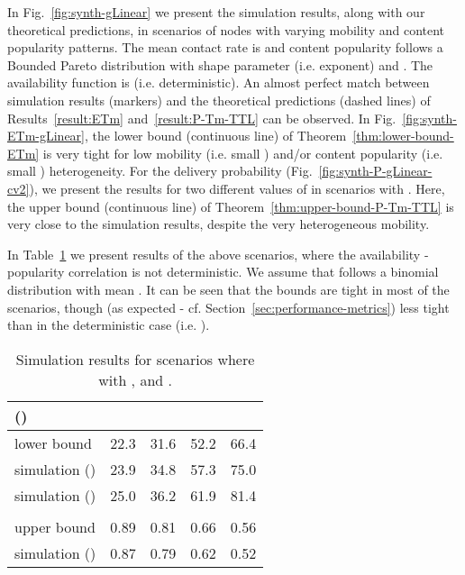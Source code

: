 \documentclass[journal]{IEEEtran}
\begin{document}
In Fig.~\ref{fig:synth-gLinear} we present the simulation results, along with our theoretical predictions, in scenarios of  nodes with varying mobility and content popularity patterns. The mean contact rate is  and content popularity follows a Bounded Pareto distribution with shape parameter (i.e. exponent)  and . The availability function is  (i.e. deterministic). An almost perfect match between simulation results (markers) and the theoretical predictions (dashed lines) of Results~\ref{result:ETm} and~\ref{result:P-Tm-TTL} can be observed. In Fig.~\ref{fig:synth-ETm-gLinear}, the lower bound (continuous line) of Theorem~\ref{thm:lower-bound-ETm} is very tight for low mobility (i.e. small ) and/or content popularity (i.e. small ) heterogeneity. For the delivery probability  (Fig.~\ref{fig:synth-P-gLinear-cv2}), we present the results for two different values of  in scenarios with  . Here, the upper bound (continuous line) of Theorem~\ref{thm:upper-bound-P-Tm-TTL} is very close to the simulation results, despite the very heterogeneous mobility.


In Table~\ref{Table:synthetic-simulation-results-binomial} we present results of the above scenarios, where the availability - popularity correlation is not deterministic. We assume that  follows a binomial distribution with mean .  It can be seen that the bounds are tight in most of the scenarios, though (as expected - cf. Section~\ref{sec:performance-metrics}) less tight than in the deterministic  case (i.e. ).

\begin{table}[!h]
\centering
\caption{Simulation results for scenarios where  with , and .}
\begin{footnotesize}
 \begin{tabular}{|l|cccc|}
\hline
{ ()}
			&     &     &     &       \\
\hline
lower bound             &   22.3    	    &	31.6	      &		52.2  	& 	 66.4     \\
simulation () &   23.9    &	34.8          &		57.3  	&  	 75.0     \\
simulation ()   &   25.0    &	36.2          &		61.9  	&  	 81.4     \\
\hline
{}
			&     &     &     &       \\
\hline
upper bound             &   0.89    	    &	0.81	      &		0.66  	& 	 0.56     \\
simulation ()&   0.87 	    &	0.79          &		0.62  	&  	 0.52     \\
\hline
 \end{tabular}
\label{Table:synthetic-simulation-results-binomial}
\end{footnotesize}
\end{table}
\end{document}
